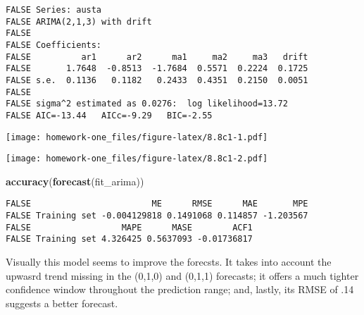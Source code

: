 \documentclass[openany]{book}
\newenvironment{Shaded}{\begin{snugshade}}{\end{snugshade}}
\newcommand{\DataTypeTok}[1]{\textcolor[rgb]{0.13,0.29,0.53}{#1}}
\newcommand{\DecValTok}[1]{\textcolor[rgb]{0.00,0.00,0.81}{#1}}
\newcommand{\KeywordTok}[1]{\textcolor[rgb]{0.13,0.29,0.53}{\textbf{#1}}}
\newcommand{\NormalTok}[1]{#1}
\newcommand{\OperatorTok}[1]{\textcolor[rgb]{0.81,0.36,0.00}{\textbf{#1}}}
\newcommand{\StringTok}[1]{\textcolor[rgb]{0.31,0.60,0.02}{#1}}
\begin{document}
\begin{verbatim}
FALSE Series: austa 
FALSE ARIMA(2,1,3) with drift 
FALSE 
FALSE Coefficients:
FALSE          ar1      ar2      ma1     ma2     ma3   drift
FALSE       1.7648  -0.8513  -1.7684  0.5571  0.2224  0.1725
FALSE s.e.  0.1136   0.1182   0.2433  0.4351  0.2150  0.0051
FALSE 
FALSE sigma^2 estimated as 0.0276:  log likelihood=13.72
FALSE AIC=-13.44   AICc=-9.29   BIC=-2.55
\end{verbatim}

\begin{Shaded}
\end{Shaded}

\texttt{[image: homework-one\_files/figure-latex/8.8c1-1.pdf]}

\begin{Shaded}
\end{Shaded}

\texttt{[image: homework-one\_files/figure-latex/8.8c1-2.pdf]}

\begin{Shaded}
\begin{Highlighting}[]
\KeywordTok{accuracy}\NormalTok{(}\KeywordTok{forecast}\NormalTok{(fit_arima))}
\end{Highlighting}
\end{Shaded}

\begin{verbatim}
FALSE                        ME      RMSE      MAE       MPE
FALSE Training set -0.004129818 0.1491068 0.114857 -1.203567
FALSE                  MAPE      MASE        ACF1
FALSE Training set 4.326425 0.5637093 -0.01736817
\end{verbatim}

Visually this model seems to improve the forecsts. It takes into account the upwasrd trend missing in the (0,1,0) and (0,1,1) forecasts; it offers a much tighter confidence window throughout the prediction range; and, lastly, its RMSE of .14 suggests a better forecast.
\end{document}
